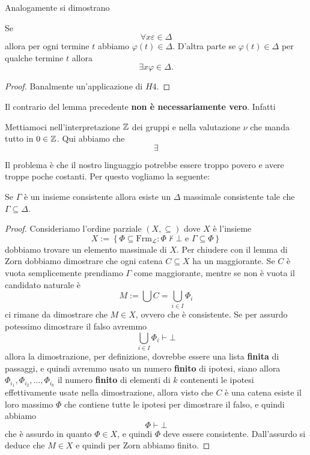 \documentclass[11pt]{scrartcl}
\begin{document}
 	Analogamente si dimostrano
 	\begin{lemma}
 		Se 
 		$$\forall x\varepsilon\in \Delta$$
 		allora per ogni termine $t$ abbiamo $\varphi(t)\in \Delta$.
 		D'altra parte se $\varphi(t)\in \Delta$ per qualche termine $t$ allora 
 		$$\exists x\varphi \in \Delta.$$ 
 	\end{lemma}
 	\begin{proof}
 		Banalmente un'applicazione di $H4$.
 	\end{proof}
 	Il contrario del lemma precedente \textbf{non è necessariamente vero}. Infatti
 	\begin{example}
 		Mettiamoci nell'interpretazione $\mathbb Z$ dei gruppi e nella valutazione $\nu$ che manda tutto in $0\in \mathbb Z$. Qui abbiamo che
 		$$\exists $$
 	\end{example}
 	Il problema è che il nostro linguaggio potrebbe essere troppo povero e avere troppe poche costanti. Per questo vogliamo la seguente:
 	\begin{proposition}
 		Se $\Gamma$ è un insieme consistente allora esiste un $\Delta$ massimale consistente tale che $\Gamma\subseteq \Delta$.
 	\end{proposition}
 	\begin{proof}
 		Consideriamo l'ordine parziale $(X,\subseteq)$ dove $X$ è l'insieme
 		$$X:=\left\{\Phi \subseteq \text{Frm}_\mathcal{L}:\Phi\not\vdash \bot \text{ e } \Gamma \subseteq \Phi\right\}$$
 		dobbiamo trovare un elemento massimale di $X$. Per chiudere con il lemma di Zorn dobbiamo dimostrare che ogni catena $C\subseteq X$ ha un maggiorante. Se $C$ è vuota semplicemente prendiamo $\Gamma$ come maggiorante, mentre se non è vuota il candidato naturale è
 		$$M:=\bigcup C=\bigcup_{i\in I}\Phi_i$$
 		ci rimane da dimostrare che $M\in X$, ovvero che è consistente. Se per assurdo potessimo dimostrare il falso avremmo
 		$$\bigcup_{i\in I}\Phi_i\vdash \bot$$
 		allora la dimostrazione, per definizione, dovrebbe essere una lista \textbf{finita} di passaggi, e quindi avremmo usato un numero \textbf{finito} di ipotesi, siano allora $\Phi_{i_1},\Phi_{i_2},\dots,\Phi_{i_k}$ il numero \textbf{finito} di elementi di $k$ contenenti le ipotesi effettivamente usate nella dimostrazione, allora visto che $C$ è una catena esiste il loro massimo $\Phi$ che contiene tutte le ipotesi per dimostrare il falso, e quindi abbiamo
 		$$\Phi\vdash \bot$$
 		che è assurdo in quanto $\Phi\in X$, e quindi $\Phi$ deve essere consistente. Dall'assurdo si deduce che $M\in X$ e quindi per Zorn abbiamo finito.
 	\end{proof}
\end{document}
